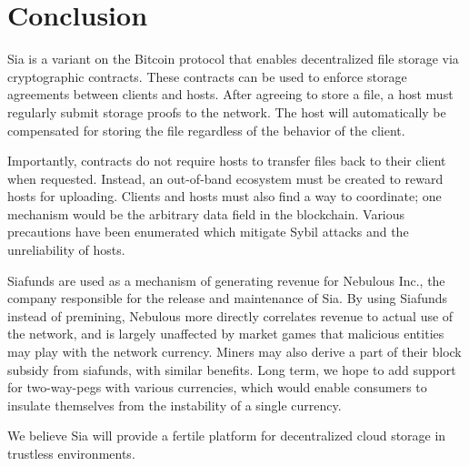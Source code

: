 \documentclass[twocolumn]{article}
\begin{document}
\section{Conclusion}
Sia is a variant on the Bitcoin protocol that enables decentralized file storage via cryptographic contracts.
These contracts can be used to enforce storage agreements between clients and hosts.
After agreeing to store a file, a host must regularly submit storage proofs to the network.
The host will automatically be compensated for storing the file regardless of the behavior of the client.

Importantly, contracts do not require hosts to transfer files back to their client when requested.
Instead, an out-of-band ecosystem must be created to reward hosts for uploading. %
Clients and hosts must also find a way to coordinate; one mechanism would be the arbitrary data field in the blockchain.
Various precautions have been enumerated which mitigate Sybil attacks and the unreliability of hosts.

Siafunds are used as a mechanism of generating revenue for Nebulous Inc., the company responsible for the release and maintenance of Sia.
By using Siafunds instead of premining, Nebulous more directly correlates revenue to actual use of the network, and is largely unaffected by market games that malicious entities may play with the network currency.
Miners may also derive a part of their block subsidy from siafunds, with similar benefits.
Long term, we hope to add support for two-way-pegs with various currencies, which would enable consumers to insulate themselves from the instability of a single currency.

We believe Sia will provide a fertile platform for decentralized cloud storage in trustless environments.
\end{document}
